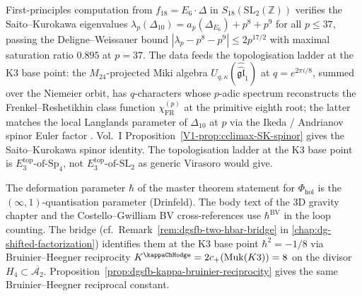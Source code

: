 \begin{remark}
\label{rem:v2-preface-arthur-hecke}
First-principles computation from
$f_{18} = E_6 \cdot \Delta$ in $S_{18}(\mathrm{SL}_2(\mathbb Z))$
verifies the Saito--Kurokawa eigenvalues
$\lambda_p(\Delta_{10}) = a_p(\Delta_{E_6}) + p^8 + p^9$ for all
$p \le 37$, passing the Deligne--Weissauer bound
$|\lambda_p - p^8 - p^9| \le 2p^{17/2}$ with maximal saturation
ratio $0.895$ at $p = 37$. The data feeds the topologisation
ladder at the K3 base point: the $M_{24}$-projected Miki algebra
$U_{q, \kappa}(\widehat{\widehat{\mathfrak{gl}}}_1)$ at
$q = e^{2\pi i / 8}$, summed over the Niemeier orbit, has
$q$-characters whose $p$-adic spectrum reconstructs the
Frenkel--Reshetikhin class function $\chi^{(p)}_{\mathrm{FR}}$ at
the primitive eighth root; the latter matches the local Langlands
parameter of $\Delta_{10}$ at $p$ via the Ikeda / Andrianov
spinor Euler factor
\cite{FrenkelReshetikhin1998qchar,Andrianov1974,Ikeda2001}.
Vol.~I Proposition~\ref{V1-prop:cclimax-SK-spinor} gives the
Saito--Kurokawa spinor identity. The
topologisation ladder at the K3 base point is
$E_3^{\mathrm{top}}\text{-of-}\mathrm{Sp}_4$, not
$E_3^{\mathrm{top}}\text{-of-}\mathrm{SL}_2$ as generic Virasoro
would give.
\end{remark}

\begin{remark}
\label{rem:v2-preface-two-hbar}
The deformation parameter $\hbar$ of the master theorem
statement for $\Phi_{\mathrm{hol}}$ is the
$(\infty,1)$-quantisation parameter (Drinfeld). The body text of
the $3$D gravity chapter and the Costello--Gwilliam BV
cross-references use $\hbar^{\mathrm{BV}}$ in the loop counting.
The bridge
(cf.~Remark~\ref{rem:dgsfb-two-hbar-bridge} in
\cref{chap:dg-shifted-factorization}) identifies them at
the K3 base point $\hbar^2 = -1/8$ via Bruinier--Heegner
reciprocity $K^{\kappaChHodge}
= 2c_+(\mathrm{Muk}(K3)) = 8$ on the divisor
$H_4 \subset \overline{\mathcal A_2}$.
Proposition~\ref{prop:dgsfb-kappa-bruinier-reciprocity} gives the
same Bruinier--Heegner reciprocal constant.
\end{remark}

